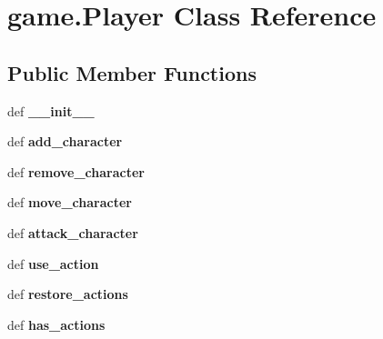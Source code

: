 \hypertarget{classgame_1_1Player}{\section{game.\-Player Class Reference}
\label{classgame_1_1Player}
}
\subsection*{Public Member Functions}
\begin{DoxyCompactItemize}
\item 
\hypertarget{classgame_1_1Player_aac645b679755efbae936ff8a378227cc}{def {\bfseries \-\_\-\-\_\-init\-\_\-\-\_\-}}\label{classgame_1_1Player_aac645b679755efbae936ff8a378227cc}

\item 
\hypertarget{classgame_1_1Player_acadb4c840f7364f7b3f7da16c209677f}{def {\bfseries add\-\_\-character}}\label{classgame_1_1Player_acadb4c840f7364f7b3f7da16c209677f}

\item 
\hypertarget{classgame_1_1Player_a62f144e05578deb655e8fd3cc9769b0e}{def {\bfseries remove\-\_\-character}}\label{classgame_1_1Player_a62f144e05578deb655e8fd3cc9769b0e}

\item 
\hypertarget{classgame_1_1Player_aea17a68c8e2d8d3ac7e5f02eca99310b}{def {\bfseries move\-\_\-character}}\label{classgame_1_1Player_aea17a68c8e2d8d3ac7e5f02eca99310b}

\item 
\hypertarget{classgame_1_1Player_adff1b583fa0f0956cc58dece9a76fb84}{def {\bfseries attack\-\_\-character}}\label{classgame_1_1Player_adff1b583fa0f0956cc58dece9a76fb84}

\item 
\hypertarget{classgame_1_1Player_a09b379bcd67b9545fffc50589b501b65}{def {\bfseries use\-\_\-action}}\label{classgame_1_1Player_a09b379bcd67b9545fffc50589b501b65}

\item 
\hypertarget{classgame_1_1Player_abcb0b1a8932098fdcd2571e91871d27d}{def {\bfseries restore\-\_\-actions}}\label{classgame_1_1Player_abcb0b1a8932098fdcd2571e91871d27d}

\item 
\hypertarget{classgame_1_1Player_a0a20f60b83f64909b12dc68a9afba7a9}{def {\bfseries has\-\_\-actions}}\label{classgame_1_1Player_a0a20f60b83f64909b12dc68a9afba7a9}

\end{DoxyCompactItemize}
